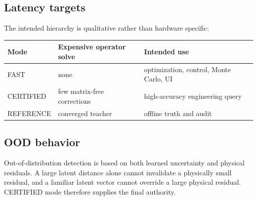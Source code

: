 \subsection{Latency targets}

The intended hierarchy is qualitative rather than hardware specific:
\begin{center}
\begin{tabular}{lll}
\toprule
Mode & Expensive operator solve & Intended use\\
\midrule
FAST & none & optimization, control, Monte Carlo, UI\\
CERTIFIED & few matrix-free corrections & high-accuracy engineering query\\
REFERENCE & converged teacher & offline truth and audit\\
\bottomrule
\end{tabular}
\end{center}

\subsection{OOD behavior}

Out-of-distribution detection is based on both learned uncertainty and physical
residuals. A large latent distance alone cannot invalidate a physically small
residual, and a familiar latent vector cannot override a large physical
residual. CERTIFIED mode therefore supplies the final authority.
